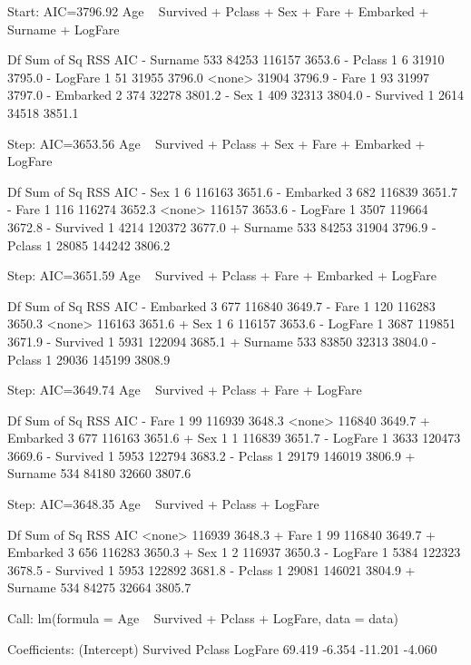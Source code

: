 \documentclass[11pt,french]{report}
\begin{document}
\begin{Schunk}
\begin{Soutput}
Start:  AIC=3796.92
Age ~ Survived + Pclass + Sex + Fare + Embarked + Surname + LogFare

            Df Sum of Sq    RSS    AIC
- Surname  533     84253 116157 3653.6
- Pclass     1         6  31910 3795.0
- LogFare    1        51  31955 3796.0
<none>                    31904 3796.9
- Fare       1        93  31997 3797.0
- Embarked   2       374  32278 3801.2
- Sex        1       409  32313 3804.0
- Survived   1      2614  34518 3851.1

Step:  AIC=3653.56
Age ~ Survived + Pclass + Sex + Fare + Embarked + LogFare

            Df Sum of Sq    RSS    AIC
- Sex        1         6 116163 3651.6
- Embarked   3       682 116839 3651.7
- Fare       1       116 116274 3652.3
<none>                   116157 3653.6
- LogFare    1      3507 119664 3672.8
- Survived   1      4214 120372 3677.0
+ Surname  533     84253  31904 3796.9
- Pclass     1     28085 144242 3806.2

Step:  AIC=3651.59
Age ~ Survived + Pclass + Fare + Embarked + LogFare

            Df Sum of Sq    RSS    AIC
- Embarked   3       677 116840 3649.7
- Fare       1       120 116283 3650.3
<none>                   116163 3651.6
+ Sex        1         6 116157 3653.6
- LogFare    1      3687 119851 3671.9
- Survived   1      5931 122094 3685.1
+ Surname  533     83850  32313 3804.0
- Pclass     1     29036 145199 3808.9

Step:  AIC=3649.74
Age ~ Survived + Pclass + Fare + LogFare

            Df Sum of Sq    RSS    AIC
- Fare       1        99 116939 3648.3
<none>                   116840 3649.7
+ Embarked   3       677 116163 3651.6
+ Sex        1         1 116839 3651.7
- LogFare    1      3633 120473 3669.6
- Survived   1      5953 122794 3683.2
- Pclass     1     29179 146019 3806.9
+ Surname  534     84180  32660 3807.6

Step:  AIC=3648.35
Age ~ Survived + Pclass + LogFare

            Df Sum of Sq    RSS    AIC
<none>                   116939 3648.3
+ Fare       1        99 116840 3649.7
+ Embarked   3       656 116283 3650.3
+ Sex        1         2 116937 3650.3
- LogFare    1      5384 122323 3678.5
- Survived   1      5953 122892 3681.8
- Pclass     1     29081 146021 3804.9
+ Surname  534     84275  32664 3805.7
\end{Soutput}
\begin{Soutput}
Call:
lm(formula = Age ~ Survived + Pclass + LogFare, data = data)

Coefficients:
(Intercept)     Survived       Pclass      LogFare  
     69.419       -6.354      -11.201       -4.060  
\end{Soutput}
\end{Schunk}
\end{document}
